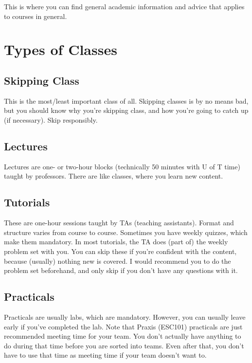 This is where you can find general academic information and advice that applies to courses in general.

\section{Types of Classes}

\subsection{Skipping Class}

This is the most/least important class of all. Skipping classes is by no means bad, but you should know why you're skipping class, and how you're going to catch up (if necessary). Skip responsibly.

\subsection{Lectures}

Lectures are one- or two-hour blocks (technically 50 minutes with U of T time) taught by professors. There are like classes, where you learn new content.

\subsection{Tutorials}

These are one-hour sessions taught by TAs (teaching assistants). Format and structure varies from course to course. Sometimes you have weekly quizzes, which make them mandatory. In most tutorials, the TA does (part of) the weekly problem set with you. You can skip these if you're confident with the content, because (usually) nothing new is covered. I would recommend you to do the problem set beforehand, and only skip if you don't have any questions with it.

\subsection{Practicals}

Practicals are usually labs, which are mandatory. However, you can usually leave early if you've completed the lab. Note that Praxis (ESC101) practicals are just recommended meeting time for your team. You don't actually have anything to do during that time before you are sorted into teams. Even after that, you don't have to use that time as meeting time if your team doesn't want to.

